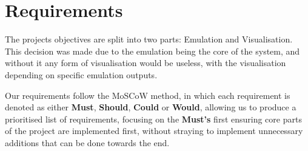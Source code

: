 \chapter{Requirements}
\label{ch:requirements}
The projects objectives are split into two parts: Emulation and Visualisation. This decision was made due to the emulation being the core of the system, and without it any form of visualisation would be useless, with the visualisation depending on specific emulation outputs.

Our requirements follow the MoSCoW method, in which each requirement is denoted as either \textbf{Must}, \textbf{Should}, \textbf{Could} or \textbf{Would}, allowing us to produce a prioritised list of requirements, focusing on the \textbf{Must's} first ensuring core parts of the project are implemented first, without straying to implement unnecessary additions that can be done towards the end.

